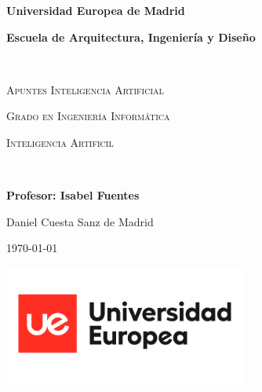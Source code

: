 
\begin{titlepage}
\centering
{\bfseries\LARGE Universidad Europea de Madrid \par}
\vspace{0cm}
{\bfseries\LARGE Escuela de Arquitectura, Ingeniería y Diseño \par}
\vfill
\noindent\hrulefill \\
{\scshape\Huge Apuntes Inteligencia Artificial \par} %
\vspace{0.5cm}
{\scshape\Large Grado en Ingeniería Informática \par}
\vspace{0.5cm}
{\scshape\Large Inteligencia Artificil \par} %
\noindent\hrulefill \\
\vfill
{\bfseries\Large Profesor: Isabel Fuentes\par}
\vfill
{\Large Daniel Cuesta Sanz de Madrid}
\vfill
{\large\today \par} %

{\includegraphics[height=4cm]{logo.png}}
\end{titlepage}
\setcounter{page}{1}
\newpage